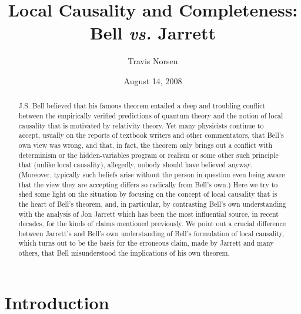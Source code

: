 \documentclass[12pt]{article}
\begin{document}
\title{Local Causality and Completeness:  Bell \emph{vs.} Jarrett}
\author{Travis Norsen}

\date{August 14, 2008}

\begin{abstract}
J.S. Bell believed that his famous theorem entailed a deep and
troubling conflict between the empirically verified predictions of
quantum theory and the notion of local causality that is motivated by
relativity theory.  Yet many physicists continue to accept, usually on 
the reports of textbook writers and other commentators, that Bell's
own view was wrong, and that, in fact, the theorem only brings out a
conflict with determinism or the hidden-variables program or realism
or some other such principle that (unlike local causality), allegedly,
nobody should have believed anyway.  (Moreover, typically such beliefs
arise without the person in question even being aware that the view
they are accepting differs so radically from Bell's own.)
Here we try to shed some light
on the situation by focusing on the concept of local causality that is
the heart of Bell's theorem, and, in particular, by contrasting Bell's
own understanding with the analysis of Jon Jarrett which has been the
most influential source, in recent decades, for the kinds of claims
mentioned previously.  We point out a crucial difference between 
Jarrett's and Bell's own understanding of Bell's formulation of 
local causality, which turns out to be the basis for the erroneous 
claim, made by Jarrett and many others, that Bell misunderstood 
the implications of his own theorem. 
\end{abstract}

\maketitle


\section{Introduction}
\end{document}

